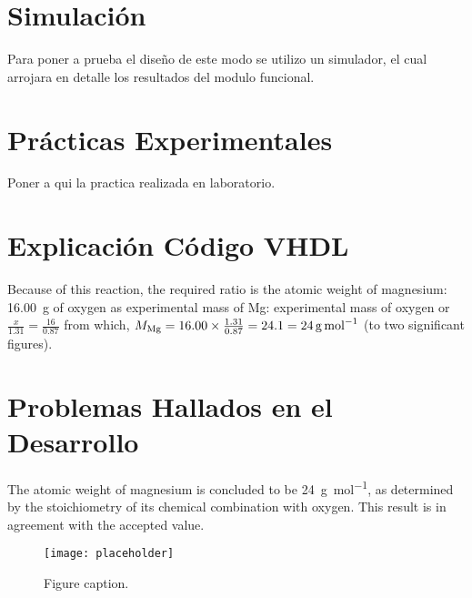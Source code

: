 \documentclass{article}
\begin{document}
\section{Simulación}
Para poner a prueba el diseño de este modo se utilizo un simulador, el cual arrojara en detalle los resultados del modulo funcional.
\section{Prácticas Experimentales}
Poner a qui la practica realizada en laboratorio.
\section{Explicación Código VHDL}
Because of this reaction, the required ratio is the atomic weight of magnesium: \SI{16.00}{\gram} of oxygen as experimental mass of Mg: experimental mass of oxygen or $\frac{x}{1.31}=\frac{16}{0.87}$ from which, $M_{\ce{Mg}} = 16.00 \times \frac{1.31}{0.87} = 24.1 = \SI{24}{\gram\per\mole}$ (to two significant figures).

\section{Problemas Hallados en el Desarrollo}
The atomic weight of magnesium is concluded to be \SI{24}{\gram\per\mol}, as determined by the stoichiometry of its chemical combination with oxygen. This result is in agreement with the accepted value.

\begin{figure}[h]
\begin{center}
\texttt{[image: placeholder]} %
\caption{Figure caption.}
\end{center}
\end{figure}
\end{document}
